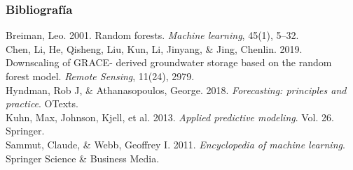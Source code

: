 \documentclass{beamer}
\begin{document}
  \begin{frame}
    \frametitle{Bibliografía}
    \small
    \begin{outline}
    \1 Breiman, Leo. 2001. Random forests. \textit{Machine learning}, 45(1), 5–32.\\
    \1 Chen, Li, He, Qisheng, Liu, Kun, Li, Jinyang, \& Jing, Chenlin. 2019. Downscaling of GRACE-
    derived groundwater storage based on the random forest model. \textit{Remote Sensing}, 11(24),
    2979.\\
    \1 Hyndman, Rob J, \& Athanasopoulos, George. 2018. \textit{Forecasting: principles and practice}.
    OTexts.\\
    \1 Kuhn, Max, Johnson, Kjell, et al. 2013. \textit{Applied predictive modeling}. Vol. 26. Springer.\\
    \1 Sammut, Claude, \& Webb, Geoffrey I. 2011. \textit{Encyclopedia of machine learning}. Springer
    Science \& Business Media.\\
    \end{outline}
    
  \end{frame}
\end{document}
